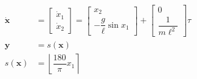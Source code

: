 \documentclass[border=0pt]{standalone}
\begin{document}
\begin{minipage}{4.6cm}
  \begin{align*}
    \dot{\mathbf{x}} &=
    \begin{bmatrix}
      \dot{x}_1 \\
      \dot{x}_2
    \end{bmatrix}
    =
    \begin{bmatrix}
      x_2 \\
      -\dfrac{g}{\ell} \sin x_1
    \end{bmatrix}
    +
    \begin{bmatrix}
      0 \\
      \dfrac{1}{m\ell^2}
    \end{bmatrix} \tau \\[0.75em]
    \mathbf{y} &= s(\mathbf{x}) \\[0.75em]
s(\mathbf{x}) &= \left\lfloor \dfrac{180}{\pi} x_1 \right\rceil
  \end{align*}
\end{minipage}
\end{document}
